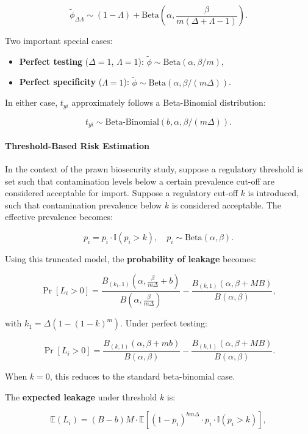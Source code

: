 \documentclass[
]{article}
\providecommand{\tightlist}{%
  \setlength{\itemsep}{0pt}\setlength{\parskip}{0pt}}
\begin{document}
\[
\tilde{\phi}_{\Delta\Lambda} \sim (1 - \Lambda) + \text{Beta} \left( \alpha, \frac{\beta}{m(\Delta + \Lambda - 1)} \right).
\]

Two important special cases:

\begin{itemize}
\tightlist
\item
  \textbf{Perfect testing} (\(\Delta = 1\), \(\Lambda = 1\)):
  \(\tilde{\phi} \sim \text{Beta}(\alpha, \beta / m)\),
\item
  \textbf{Perfect specificity} (\(\Lambda = 1\)):
  \(\tilde{\phi} \sim \text{Beta}(\alpha, \beta / (m \Delta))\).
\end{itemize}

In either case, \(t_{yi}\) approximately follows a Beta-Binomial
distribution:

\[
t_{yi} \sim \text{Beta-Binomial}(b, \alpha, \beta / (m\Delta)).
\]

\paragraph{Threshold-Based Risk
Estimation}\label{threshold-based-risk-estimation}

In the context of the prawn biosecurity study, suppose a regulatory
threshold is set such that contamination levels below a certain
prevalence cut-off are considered acceptable for import. Suppose a
regulatory cut-off \(k\) is introduced, such that contamination
prevalence below \(k\) is considered acceptable. The effective
prevalence becomes:

\[
p_i = p_i \cdot \mathbb{I}(p_i > k), \quad p_i \sim \text{Beta}(\alpha, \beta).
\]

Using this truncated model, the \textbf{probability of leakage} becomes:

\[
\Pr[L_i > 0] = \frac{B_{(k_1,1)}(\alpha, \frac{\beta}{m\Delta} + b)}{B(\alpha, \frac{\beta}{m\Delta})} - \frac{B_{(k,1)}(\alpha, \beta + MB)}{B(\alpha, \beta)},
\]

with \(k_1 = \Delta(1 - (1 - k)^m)\). Under perfect testing:

\[
\Pr[L_i > 0] = \frac{B_{(k,1)}(\alpha, \beta + mb)}{B(\alpha, \beta)} - \frac{B_{(k,1)}(\alpha, \beta + MB)}{B(\alpha, \beta)}.
\]

When \(k = 0\), this reduces to the standard beta-binomial case.

The \textbf{expected leakage} under threshold \(k\) is:

\[
\mathbb{E}(L_i) = (B - b) M \cdot \mathbb{E}\left[ (1 - p_i)^{bm\Delta} \cdot p_i \cdot \mathbb{I}(p_i > k) \right],
\]
\end{document}
